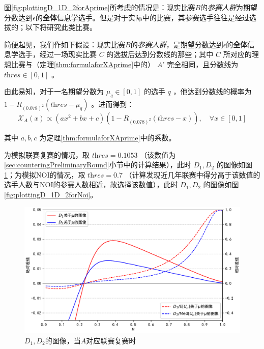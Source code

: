             \vspace{1.5ex}

            图\ref{fig:plottingD_1D_2forAprime}所考虑的情况是：现实比赛$B$的\emph{参赛人群}为期望分数达到$\epsilon$的\textbf{全体}信息学选手。但是对于实际中的比赛，其参赛选手往往是经过选拔的；以下将研究此类比赛。

            简便起见，我们作如下假设：现实比赛$B$的\emph{参赛人群}，是期望分数达到$\epsilon$的\textbf{全体}信息学选手，经过一场现实比赛 $C$ 的选拔后达到分数线的那些；其中 $C$ 所对应的理想比赛与（定理\ref{thm:formulaforXAprime}中的） $A'$ 完全相同，且分数线为 $\textit{thres}\in[0,1]$ 。

            由此易知，对于一名期望分数为 $\mu_q\in [0,1]$ 的选手 $q$ ，他达到分数线的概率为 $1-R_{(0.078)^2}(\textit{thres}-\mu_q)$ 。进而得到：
            $$
            \mathcal{X}_A(x)\propto (ax^2+bx+c)\left(1-R_{(0.078)^2}(\textit{thres}-x)\right),\quad\forall x\in [0,1]
            $$

            其中 $a,b,c$ 为定理\ref{thm:formulaforXAprime}中的系数。

            \vspace{1.5ex}

            为模拟联赛复赛的情况，取 $\textit{thres}=0.1053$ （该数值为\ref{sec:counteringPreliminaryRound}小节中的计算结果），此时 $D_1,D_2$ 的图像如图\ref{fig:plottingD_1D_2forNoip}；为模拟NOI的情况，取 $\textit{thres}=0.7$ （计算发现近几年联赛中得分高于该数值的选手人数与NOI的参赛人数相近，故选择该数值），此时 $D_1,D_2$ 的图像如图\ref{fig:plottingD_1D_2forNoi}。

            \begin{figure}[p]
                \centering
                \includegraphics[width=\textwidth]{fig/plottingNoipD_1D_2.pdf}
                \caption{$D_1,D_2$的图像，当$A$对应联赛复赛时}
                \label{fig:plottingD_1D_2forNoip}
            \end{figure}

